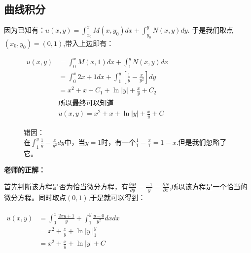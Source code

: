 \documentclass[fontset=windows]{article}
\begin{document}
    \subsection{曲线积分}
    因为已知有：$u(x,y)=\int_{x_0}^{x}{M(x,y_0) dx}+\int_{y_0}^{y}{N(x,y) dy}$.
    于是我们取点$(x_0,y_0)=(0, 1)$,带入上边即有：\\
    \begin{figure}[!htb]
    \begin{minipage}[t]{0.4\linewidth}
    \hspace*{1pt}

    $
    \begin{aligned}
    u(x,y)&=\int_{0}^{x}{M(x,1) dx}+\int_{1}^{y}{N(x,y) dx}\nonumber\\
        &=\int_{0}^{x}{2x+1 dx}+\int_{1}^{y}{[\frac{1}{y}-\frac{x}{y^2}] dy}\nonumber\\
        &=x^2+x+C_1+\ln|y|+\frac{x}{y}+C_2\nonumber\\
        &\text{所以最终可以知道}\nonumber\\
        &u(x,y)=x^2+x+\ln|y|+\frac{x}{y}+C\nonumber
    \end{aligned}
    $
    \end{minipage}
    \begin{minipage}[t]{0.2\linewidth}
    \centering
        \color{blue}{$\Longrightarrow$}
    \end{minipage}
    \begin{minipage}[t]{0.4\linewidth}
    \hspace*{1pt}

    \color{blue}
    {
        错因：\\
        在$\int_{1}^{y}{\frac{1}{y}-\frac{x}{y^2}}dy$中，当$y=1$时，有一个$\frac{1}{1}-\frac{x}{1}=1-x$.但是我们忽略了它。


    }
    \end{minipage}
    \end{figure}

    \noindent\textbf{老师的正解：}

    首先判断该方程是否为恰当微分方程，有$\frac{\partial M}{\partial y}=\frac{-1}{y}=\frac{\partial N}{\partial x}$,所以该方程是一个恰当的微分方程。同时取点$(0, 1)$,于是就可以得到：\\
    \vspace*{3pt}\\
    $
        \begin{aligned}
            u(x,y)&=\int_{0}^{x}{\frac{2xy+1}{y}+\int_{1}^{y}{\frac{y-0}{y^2} dx} dx}\nonumber \\
            &=x^2+\frac{x}{y}+\ln|y||_1^y\nonumber \\
            &=x^2+\frac{x}{y}+\ln|y|+C\nonumber \\
        \end{aligned} 
    $
\end{document}
